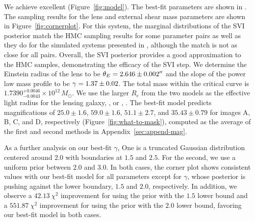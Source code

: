 We achieve excellent  (Figure~\ref{fig:model}). 
The best-fit parameters are shown in .
The sampling results for the lens and external shear mass parameters are shown in Figure~\ref{fig:cornerplot}. 
For this system, the marginal distributions of the SVI posterior match the HMC sampling results for some parameter pairs as well as they do for the simulated systems presented in \citet[][their Figures~6 and A2]{gu2022a}, although the match is not as close for all pairs. Overall, the SVI posterior provides a good approximation to the HMC samples, demonstrating the efficacy of the SVI step.
We determine the Einstein radius of the lens to be $\theta_E = 2.646\pm0.002^{\prime \prime}$ 
and the slope of the power law mass profile to be $\gamma = 1.37\pm0.02$.
The total mass within the critical curve is $1.7390_{-0.0043}^{+0.0046} \times 10^{12} \, M_{\odot}$. 
We use the larger $R_e$ from the two \ser models as the effective light radius for the lensing galaxy, \Refit, or \Refitkpc, .
The best-fit model predicts magnifications of 
$25.0\pm 1.6$, $59.0\pm 1.6$, $51.1\pm 2.7$, and $35.43\pm 0.79$ for images A, B, C, and D, respectively (Figure~\ref{fig:what-to-mask}), computed as the average of the first and second methods in Appendix~\ref{sec:append-mag}.

As a further analysis on our best-fit $\gamma$, 
One is a truncated Gaussian distribution centered around $2.0$ with boundaries at $1.5$ and $2.5$.
For the second, we use a uniform prior between $2.0$ and $3.0$.
In both cases, the corner plot shows consistent values with our best-fit model for all parameters except for $\gamma$, whose posterior is pushing against the lower boundary, $1.5$ and $2.0$, respectively. In addition, we observe a $42.13 \ \chi^2$ improvement for using the prior with the $1.5$ lower bound and a $551.87 \ \chi^2$ improvement for using the prior with the $2.0$ lower bound, favoring our best-fit model in both cases.

